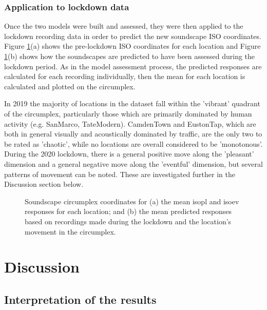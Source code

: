   \subsubsection{Application to lockdown data}
   Once the two models were built and assessed, they were then applied to the lockdown recording data in order to predict the new soundscape ISO coordinates. Figure \ref{fig:circumplex-locations}(a) shows the pre-lockdown ISO coordinates for each location and Figure \ref{fig:circumplex-locations}(b) shows how the soundscapes are predicted to have been assessed during the lockdown period. As in the model assessment process, the predicted responses are calculated for each recording individually, then the mean for each location is calculated and plotted on the circumplex.

   In 2019 the majority of locations in the dataset fall within the 'vibrant' quadrant of the circumplex, particularly those which are primarily dominated by human activity (e.g. SanMarco, TateModern). CamdenTown and EustonTap, which are both in general visually and acoustically dominated by traffic, are the only two to be rated as 'chaotic', while no locations are overall considered to be 'monotonous'. During the 2020 lockdown, there is a general positive move along the 'pleasant' dimension and a general negative move along the 'eventful' dimension, but several patterns of movement can be noted. These are investigated further in the Discussion section below.

   \begin{figure}
     \label{fig:circumplex-locations}
     \caption{Soundscape circumplex coordinates for (a) the mean \gls{isopl} and \gls{isoev} responses for each location; and (b) the mean predicted responses based on recordings made during the lockdown and the location's movement in the circumplex.}
   \end{figure}


\section{Discussion}

 \subsection{Interpretation of the results}

